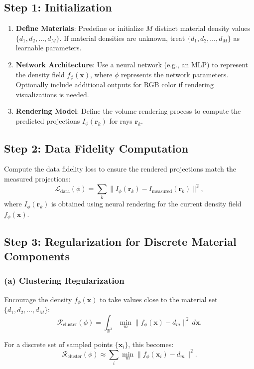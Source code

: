 \subsection{Step 1: Initialization}
\begin{enumerate}
	\item \textbf{Define Materials}: Predefine or initialize \( M \) distinct material density values \( \{d_1, d_2, \dots, d_M\} \). If material densities are unknown, treat \( \{d_1, d_2, \dots, d_M\} \) as learnable parameters.
	\item \textbf{Network Architecture}: Use a neural network (e.g., an MLP) to represent the density field \( f_\phi(\mathbf{x}) \), where \( \phi \) represents the network parameters. Optionally include additional outputs for RGB color if rendering visualizations is needed.
	\item \textbf{Rendering Model}: Define the volume rendering process to compute the predicted projections \( I_\phi(\mathbf{r}_k) \) for rays \( \mathbf{r}_k \).
\end{enumerate}

\subsection{Step 2: Data Fidelity Computation}
Compute the data fidelity loss to ensure the rendered projections match the measured projections:
\[
\mathcal{L}_{\text{data}}(\phi) = \sum_k \| I_\phi(\mathbf{r}_k) - I_{\text{measured}}(\mathbf{r}_k) \|^2,
\]
where \( I_\phi(\mathbf{r}_k) \) is obtained using neural rendering for the current density field \( f_\phi(\mathbf{x}) \).

\subsection{Step 3: Regularization for Discrete Material Components}
\subsubsection{(a) Clustering Regularization}
Encourage the density \( f_\phi(\mathbf{x}) \) to take values close to the material set \( \{d_1, d_2, \dots, d_M\} \):
\[
\mathcal{R}_{\text{cluster}}(\phi) = \int_{\mathbb{R}^3} \min_{m} \| f_\phi(\mathbf{x}) - d_m \|^2 \, d\mathbf{x}.
\]

For a discrete set of sampled points \( \{\mathbf{x}_i\} \), this becomes:
\[
\mathcal{R}_{\text{cluster}}(\phi) \approx \sum_{i} \min_{m} \| f_\phi(\mathbf{x}_i) - d_m \|^2.
\]

